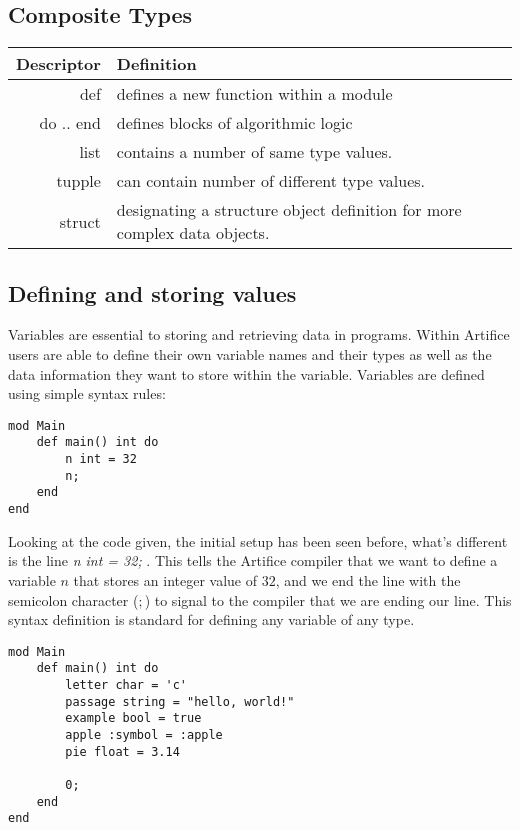 \documentclass{article}
\begin{document}
\subsection{Composite Types}
\begin{center}
\begin{tabular}{|r|l|}
	\hline
	Descriptor & Definition \\
	\hline
	\hline
	def & defines a new function within a module \\
	do .. end & defines blocks of algorithmic logic \\
	list & contains a number of same type values. \\
	tupple & can contain number of different type values. \\
	struct & designating a structure object definition for more complex data objects. \\
	\hline
\end{tabular}
\end{center}

\subsection{Defining and storing values}

Variables are essential to storing and retrieving data in programs. Within Artifice users are able to define their own variable names and their types
as well as the data information they want to store within the variable. Variables are defined using simple syntax rules:

\begin{lstlisting}
mod Main
	def main() int do
		n int = 32
		n;
	end
end
\end{lstlisting}

Looking at the code given, the initial setup has been seen before, what's different is the line \textit{n int = 32;} . This tells the Artifice compiler that we want
to define a variable $n$ that stores an integer value of $32$, and we end the line with the semicolon character ($;$) to signal to the compiler that we are ending our
line. This syntax definition is standard for defining any variable of any type.

\begin{lstlisting}
mod Main
	def main() int do
		letter char = 'c'
		passage string = "hello, world!"
		example bool = true
		apple :symbol = :apple
		pie float = 3.14

		0;
	end
end
\end{lstlisting}
\end{document}
